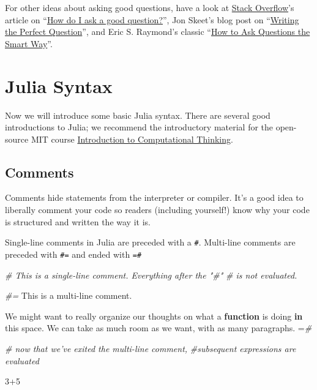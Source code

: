 \documentclass[
  11pt,
]{book}
\newenvironment{Shaded}{\begin{snugshade}}{\end{snugshade}}
\newcommand{\CommentTok}[1]{\textcolor[rgb]{0.37,0.37,0.37}{\textit{#1}}}
\newcommand{\FloatTok}[1]{\textcolor[rgb]{0.06,0.06,0.06}{#1}}
\newcommand{\KeywordTok}[1]{\textcolor[rgb]{0.27,0.27,0.27}{\textbf{#1}}}
\newcommand{\NormalTok}[1]{#1}
\begin{document}
For other ideas about asking good questions, have a look at \href{http://www.stackoverflow.com}{Stack Overflow}'s article on \enquote{\href{http://stackoverflow.com/help/how-to-ask}{How do I ask a good question?}}, Jon Skeet's blog post on \enquote{\href{https://codeblog.jonskeet.uk/2010/08/29/writing-the-perfect-question/}{Writing the Perfect Question}}, and Eric S. Raymond's classic \enquote{\href{http://www.catb.org/esr/faqs/smart-questions.html}{How to Ask Questions the Smart Way}}.

\hypertarget{julia-syntax-1}{%
\section{Julia Syntax}\label{julia-syntax-1}}

Now we will introduce some basic Julia syntax. There are several good introductions to Julia; we recommend the introductory material for the open-source MIT course \href{https://computationalthinking.mit.edu/Spring21/}{Introduction to Computational Thinking}.

\hypertarget{comments}{%
\subsection{Comments}\label{comments}}

Comments hide statements from the interpreter or compiler. It's a good idea to liberally comment your code so readers (including yourself!) know why your code is structured and written the way it is.

Single-line comments in Julia are preceded with a \texttt{\#}. Multi-line comments are preceded with \texttt{\#=} and ended with \texttt{=\#}

\begin{Shaded}
\begin{Highlighting}[]
\CommentTok{# This is a single-line comment. Everything after the "#"}
\CommentTok{#   is not evaluated.}

\CommentTok{#=}
\NormalTok{This is a multi-line comment.}

\NormalTok{We might want to really organize our thoughts on what a }
\KeywordTok{function}\NormalTok{ is doing }\KeywordTok{in}\NormalTok{ this space. We can take as much room }
\NormalTok{as we want, with as many paragraphs.}
\NormalTok{=}\CommentTok{#}

\CommentTok{# now that we've exited the multi-line comment, }
\CommentTok{#subsequent expressions are evaluated}

\FloatTok{3}\NormalTok{+}\FloatTok{5} 
\end{Highlighting}
\end{Shaded}
\end{document}
